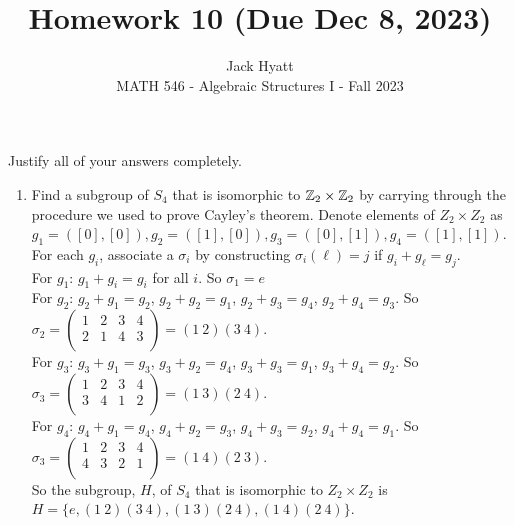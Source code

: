 \documentclass[12pt]{article}
\begin{document}
	
	
	
	\title{Homework 10 (Due Dec 8, 2023)}
	\author{Jack Hyatt\\ %
		MATH 546 - Algebraic Structures I - Fall 2023} 
	
	\maketitle
	
	Justify all of your answers completely.\\
	
	
	\medskip 
	
	\begin{enumerate}
		\item Find a subgroup of $S_4$ that is isomorphic to $\mathbb{Z}_2\times\mathbb{Z}_2$ by carrying through the procedure we used to prove Cayley's theorem.\m
		Denote elements of $Z_2 \times Z_2$ as $g_1 = ([0],[0]), g_2 = ([1],[0]), g_3 = ([0],[1]), g_4 = ([1],[1])$.\\
		For each $g_i$, associate a $\sigma_i$ by constructing $\sigma_i(\ell) = j$ if $g_i + g_\ell = g_j$.\\
		For $g_1$: $g_1 + g_i = g_i$ for all $i$. So $\sigma_1 = e$\\
		For $g_2$: $g_2 + g_1 = g_2$, $g_2 + g_2 = g_1$, $g_2 + g_3 = g_4$, $g_2 + g_4 = g_3$. So $\sigma_2 = \begin{pmatrix}
			1 & 2 & 3 & 4 \\
			2 & 1 & 4 & 3 \\
		\end{pmatrix} = (1\ 2)(3\ 4)$.\\
		For $g_3$: $g_3 + g_1 = g_3$, $g_3 + g_2 = g_4$, $g_3 + g_3 = g_1$, $g_3 + g_4 = g_2$. So $\sigma_3 = \begin{pmatrix}
			1 & 2 & 3 & 4 \\
			3 & 4 & 1 & 2 \\
		\end{pmatrix} = (1\ 3)(2\ 4)$.\\
		For $g_4$: $g_4 + g_1 = g_4$, $g_4 + g_2 = g_3$, $g_4 + g_3 = g_2$, $g_4 + g_4 = g_1$. So $\sigma_3 = \begin{pmatrix}
			1 & 2 & 3 & 4 \\
			4 & 3 & 2 & 1 \\
		\end{pmatrix} = (1\ 4)(2\ 3)$.\\
		So the subgroup, $H$, of $S_4$ that is isomorphic to $Z_2 \times Z_2$ is\\
		$H = \{e,(1\ 2)(3\ 4),(1\ 3)(2\ 4),(1\ 4)(2\ 4)\}$.
		

\end{enumerate}
\end{document}
